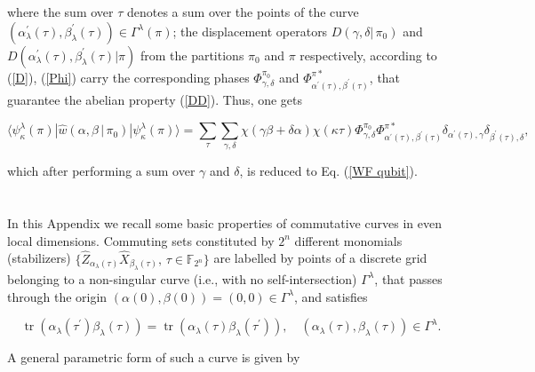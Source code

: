 \documentclass[quantumrep,article,submit,pdftex,moreauthors]{Definitions/mdpi}
\DeclareMathOperator{\tr}{tr}
\begin{document}
where the sum over $\tau$ denotes a sum over the points of the curve
$\left(\alpha_{\lambda}^{\prime}(\tau),\beta_{\lambda}^{\prime}(\tau)\right) \in
\Gamma^{\lambda}(\pi)$; the displacement operators $D\left(\gamma,\delta
|\,\pi_{0}\right)$ and
$D\left(\alpha_{\lambda}^{\prime}(\tau),\beta_{\lambda}^{\prime
}(\tau)|\pi\right)$ from the partitions $\pi_{0}$ and $\pi$ respectively,
according to (\ref{D}), (\ref{Phi}) carry the corresponding phases
$\Phi_{\gamma,\delta}^{\pi_{0}}$ and
$\Phi_{\alpha^{\prime}(\tau),\beta^{\prime}(\tau )}^{\pi \ast }$, that guarantee
the abelian property (\ref{DD}). Thus, one gets

\begin{equation}
  \langle \psi_{\kappa}^{\lambda }(\pi)
  |\hat{w}\left(\alpha,\beta\,|\,\pi _{0}\right)
  |\psi_{\kappa}^{\lambda}(\pi)\rangle
  = \sum_{\tau}\sum\limits_{\gamma,\delta}
  \chi\left(\gamma \beta +\delta \alpha\right) \chi (\kappa \tau)
  \Phi_{\gamma,\delta }^{\pi_{0}}
  \Phi_{\alpha^{\prime}(\tau),\beta^{\prime}(\tau)}^{\pi\ast}
  \delta_{\alpha^{\prime }(\tau),\gamma}
  \delta_{\beta^{\prime }(\tau),\delta},
\end{equation}

which after performing a sum over $\gamma$ and $\delta$, is reduced to Eq.
(\ref{WF qubit}).

\section[\appendixname~\thesection]{}
\label{appB}

In this Appendix we recall some basic properties of commutative curves in even
local dimensions. Commuting sets constituted by $2^{n}$ different monomials
(stabilizers)
$\{\hat{Z}_{\alpha_{\lambda}(\tau)}\hat{X}_{\beta_{\lambda}(\tau)}, \, \tau \in
\mathbb{F}_{2^{n}}\}$ are labelled by points of a discrete grid belonging to a
non-singular curve (i.e., with no self-intersection) $\Gamma^{\lambda}$, that
passes through the origin $(\alpha (0),\beta (0))=(0,0)\in \Gamma^{\lambda }$,
and satisfies

\begin{equation*}
  \tr\left( \alpha_{\lambda}(\tau^{\prime})\beta_{\lambda}(\tau) \right)
  = \tr\left( \alpha_{\lambda}(\tau)\beta_{\lambda}(\tau^{\prime}) \right),
  \quad \left( \alpha_{\lambda}(\tau), \beta_{\lambda}(\tau) \right)
  \in \Gamma^{\lambda}.
\end{equation*}

A general parametric form of such a curve is given by
\end{document}
